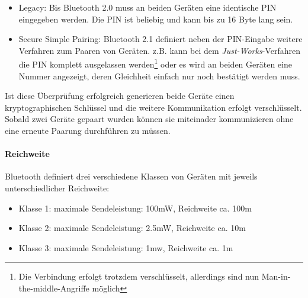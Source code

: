             \begin{itemize}
                \item{Legacy:} Bis Bluetooth 2.0 muss an beiden Geräten eine identische PIN
                               eingegeben werden. Die PIN ist beliebig und kann bis zu
                               16 Byte lang sein.
                \item{Secure Simple Pairing:} Bluetooth 2.1 definiert neben der PIN-Eingabe
                                              weitere Verfahren zum Paaren von Geräten.
                                              z.B. kann bei dem \textsl{Just-Works}-Verfahren
                                              die PIN komplett ausgelassen werden\footnote{Die
                                              Verbindung erfolgt trotzdem verschlüsselt,
                                              allerdings sind nun Man-in-the-middle-Angriffe 
                                              möglich} oder es wird an beiden Geräten eine
                                              Nummer angezeigt, deren Gleichheit einfach
                                              nur noch bestätigt werden muss.
            \end{itemize}

            Ist diese Überprüfung erfolgreich generieren beide Geräte einen kryptographischen
            Schlüssel und die weitere Kommunikation erfolgt verschlüsselt. Sobald zwei
            Geräte gepaart wurden können sie miteinader kommunizieren ohne eine erneute
            Paarung durchführen zu müssen.

        \paragraph{Reichweite}
            Bluetooth definiert drei verschiedene Klassen von Geräten mit jeweils
            unterschiedlicher Reichweite:

            \begin{itemize}
                \item{Klasse 1:} maximale Sendeleistung: 100mW, Reichweite ca. 100m
                \item{Klasse 2:} maximale Sendeleistung: 2.5mW, Reichweite ca. 10m
                \item{Klasse 3:} maximale Sendeleistung:   1mw, Reichweite ca. 1m
            \end{itemize}


